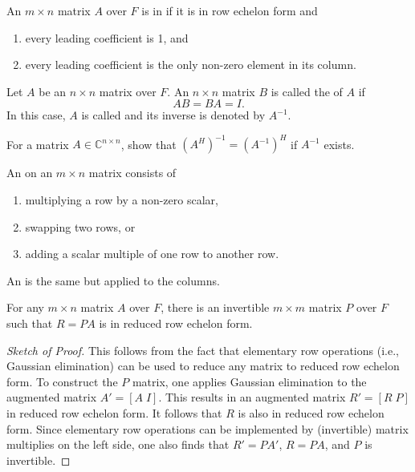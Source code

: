 \begin{definition}
An $m\times n$ matrix $A$ over $F$ is in  if it is in row echelon form and
\begin{enumerate}
\item every leading coefficient is 1, and
\item every leading coefficient is the only non-zero element in its column.
\end{enumerate}
\end{definition}

\begin{definition}
Let $A$ be an $n \times n$ matrix over $F$.
An $n \times n$ matrix $B$ is called the  of $A$ if
\begin{equation*}
AB = BA = I.
\end{equation*}
In this case, $A$ is called  and its inverse is denoted by $A^{-1}$.
\end{definition}

\begin{problem}
For a matrix $A\in \mathbb{C}^{n\times n}$, show that $(A^H)^{-1} = (A^{-1})^H$ if $A^{-1}$ exists.
\end{problem}

\begin{definition}
An  on an $m \times n$ matrix consists of
\begin{enumerate}
\item multiplying a row by a non-zero scalar,
\item swapping two rows, or
\item adding a scalar multiple of one row to another row.
\end{enumerate}
An  is the same but applied to the columns.
\end{definition}

\begin{lemma}
For any $m\times n$ matrix $A$ over $F$, there is an invertible $m \times m$ matrix $P$ over $F$ such that $R=PA$ is in reduced row echelon form.
\end{lemma}
\begin{proof}[Sketch of Proof]
This follows from the fact that elementary row operations (i.e., Gaussian elimination) can be used to reduce any matrix to reduced row echelon form.
To construct the $P$ matrix, one applies Gaussian elimination to the augmented matrix $A' = [A \; I]$.
This results in an augmented matrix $R' = [R\; P]$ in reduced row echelon form.
It follows that $R$ is also in reduced row echelon form.
Since elementary row operations can be implemented by (invertible) matrix multiplies on the left side, one also finds that $R' = P A'$, $R = PA$, and $P$ is invertible.
\end{proof}

